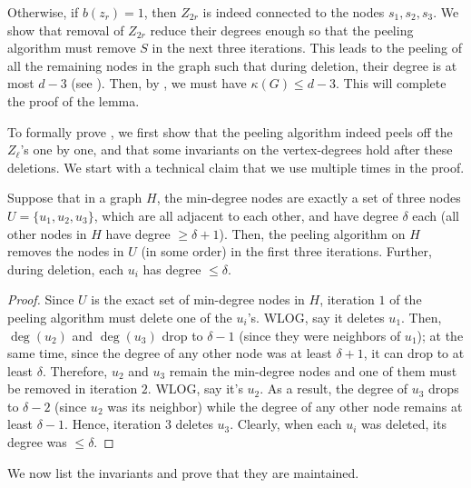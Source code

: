 Otherwise, if $b(z_r)=1$, then $Z_{2r}$ is indeed connected to the nodes $s_1,s_2,s_3$. We show that removal of $Z_{2r}$ reduce their degrees enough so that the peeling algorithm must remove $S$ in the next three iterations. This leads to the peeling of all the remaining nodes in the graph such that during deletion, their degree is at most $d-3$ (see ). Then, by , we must have $\kappa(G)\leq d-3$. This will complete the proof of the lemma. 

 To formally prove , we first show that the peeling algorithm indeed peels off the $Z_\ell$'s one by one, and that some invariants on the vertex-degrees hold after these deletions. We start with a technical claim that we use multiple times in the proof. 

\begin{claim}\label{clm:zl-del}
Suppose that in a graph $H$, the min-degree nodes are exactly a set of three nodes $U=\{u_1,u_2,u_3\}$, which are all adjacent to each other, and have degree $\delta$ each (all other nodes in $H$ have degree $\geq \delta+1$). Then, the peeling algorithm on $H$ removes the nodes in $U$ (in some order) in the first three iterations. Further, during deletion, each $u_i$ has degree $\leq \delta$. 
\end{claim}

\begin{proof}
Since $U$ is the exact set of min-degree nodes in $H$, iteration $1$ of the peeling algorithm must delete one of the $u_i$'s. WLOG, say it deletes $u_1$. Then, $\deg(u_2)$ and $\deg(u_3)$ drop to $\delta-1$ (since they were neighbors of $u_1$); at the same time, since the degree of any other node was at least $\delta+1$, it can drop to at least $\delta$. Therefore, $u_2$ and $u_3$ remain the min-degree nodes and one of them must be removed in iteration $2$. WLOG, say it's $u_2$. As a result, the degree of $u_3$ drops to $\delta-2$ (since $u_2$ was its neighbor) while the degree of any other node remains at least $\delta-1$. Hence, iteration $3$ deletes $u_3$. Clearly, when each $u_i$ was deleted, its degree was $\leq \delta$.
\end{proof}

We now list the invariants and prove that they are maintained.

